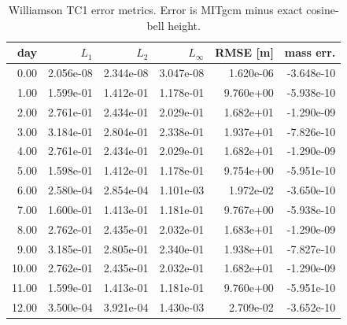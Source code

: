 \begin{table}[htbp]
\centering
{}
\begin{tabular}{rrrrrr}
\toprule
\rowcolor{gray!25}
day & $L_1$ & $L_2$ & $L_\infty$ & RMSE [m] & mass err. \\ 
\midrule
0.00 & 2.056e-08 & 2.344e-08 & 3.047e-08 & 1.620e-06 & -3.648e-10 \\ 
1.00 & 1.599e-01 & 1.412e-01 & 1.178e-01 & 9.760e+00 & -5.938e-10 \\ 
2.00 & 2.761e-01 & 2.434e-01 & 2.029e-01 & 1.682e+01 & -1.290e-09 \\ 
3.00 & 3.184e-01 & 2.804e-01 & 2.338e-01 & 1.937e+01 & -7.826e-10 \\ 
4.00 & 2.761e-01 & 2.434e-01 & 2.029e-01 & 1.682e+01 & -1.290e-09 \\ 
5.00 & 1.598e-01 & 1.412e-01 & 1.178e-01 & 9.754e+00 & -5.951e-10 \\ 
6.00 & 2.580e-04 & 2.854e-04 & 1.101e-03 & 1.972e-02 & -3.650e-10 \\ 
7.00 & 1.600e-01 & 1.413e-01 & 1.181e-01 & 9.767e+00 & -5.938e-10 \\ 
8.00 & 2.762e-01 & 2.435e-01 & 2.032e-01 & 1.683e+01 & -1.290e-09 \\ 
9.00 & 3.185e-01 & 2.805e-01 & 2.340e-01 & 1.938e+01 & -7.827e-10 \\ 
10.00 & 2.762e-01 & 2.435e-01 & 2.032e-01 & 1.682e+01 & -1.290e-09 \\ 
11.00 & 1.599e-01 & 1.413e-01 & 1.181e-01 & 9.760e+00 & -5.951e-10 \\ 
12.00 & 3.500e-04 & 3.921e-04 & 1.430e-03 & 2.709e-02 & -3.652e-10 \\ 
\bottomrule
\end{tabular}
\caption{Williamson TC1 error metrics. Error is MITgcm minus exact cosine-bell height.}
\end{table}
